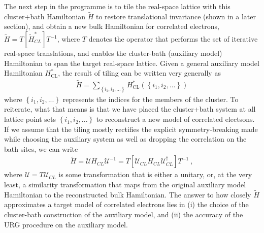 \documentclass{report}
\numberwithin{equation}{section}
\begin{document}
The next step in the programme is to tile the real-space lattice with this cluster+bath Hamiltonian \(\tilde H\) to restore translational invariance (shown in a later section), and obtain a new bulk Hamiltonian for correlated electrons, $\tilde H = T\left[ \tilde H^{*}_{CL} \right] T^{-1}$, where $T$ denotes the operator that performs the set of iterative real-space translations, and enables the cluster-bath (auxiliary model) Hamiltonian to span the target real-space lattice. Given a general auxiliary model Hamiltonian \(H_\text{CL}^*\), the result of tiling can be written very generally as
 \begin{equation}\begin{aligned}
	 \tilde H = \sum_{\left\{i_1,i_2,...\right\}} H^*_\text{CL}\left(\left\{i_1,i_2,...\right\}\right)
 \end{aligned}\end{equation}
where \(\left\{i_1,i_2,...\right\}\) represents the indices for the members of the cluster. To reiterate, what that means is that we have placed the cluster+bath system at all lattice point sets \(\left\{i_1,i_2,...\right\}\) to reconstruct a new model of correlated electsons. If we assume that the tiling mostly rectifies the explicit symmetry-breaking made while choosing the auxiliary system as well as dropping the correlation on the bath sites, we can write
 \begin{equation}\begin{aligned}
 	\label{app2}
 	\tilde H = \mathcal{U} H_{CL} \mathcal{U}^{-1} = T\left[\mathcal{U}_{CL} H_{CL} \mathcal{U}_{CL}^\dagger \right]T^{-1}~,
 \end{aligned}\end{equation}
 where $\mathcal{U} = T \mathcal{U}_{CL}$ is some transformation that is either a unitary, or, at the very least, a similarity transformation that maps from the original auxiliary model Hamiltonian to the reconstructed bulk Hamiltonian. The answer to how closely $\tilde H$ approximates a target model of correlated electrons lies in (i) the choice of the cluster-bath construction of the auxiliary model, and (ii) the accuracy of the URG procedure on the auxiliary model. 
\end{document}
